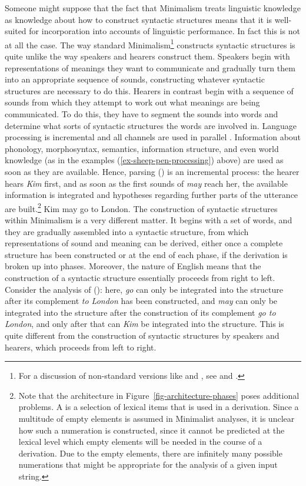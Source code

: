 \documentclass[output=paper
	        ,collection
	        ,collectionchapter
 	        ,biblatex
                ,babelshorthands
                ,newtxmath
                ,draftmode
                ,colorlinks, citecolor=brown
]{langscibook}
\begin{document}
Someone might suppose that the fact that Minimalism treats linguistic knowledge as knowledge about
how to construct syntactic structures means that it is well-suited for incorporation into accounts
of linguistic performance. In fact this is not at all the case. The way standard
Minimalism\footnote{%
For a discussion of non-standard versions like \citet{Phillips2003a} and \citet{Chesi2015a-u}, see
 and .%
} constructs syntactic structures is quite unlike the way speakers and hearers construct them. Speakers begin
with representations of meanings they want to communicate and gradually turn them into an
appropriate sequence of sounds, constructing whatever syntactic structures are necessary to do
this. Hearers in contrast begin with a sequence of sounds from which they attempt to work out what
meanings are being communicated. To do this, they have to segment the sounds into words and
determine what sorts of syntactic structures the words are involved in. 
Language processing is incremental and all channels are used in
parallel \citep{Marslen-Wilson75a,TSKES95a,TSKES96a}. Information about phonology, morphosyntax, semantics, information structure, and even
world knowledge (as in the examples (\ref{ex-sheep-pen-processing}) above) are used as soon as they
are available. Hence, parsing () is an incremental process: the hearer hears \emph{Kim} first,
and as soon as the first sounds of \emph{may} reach her, the available information is integrated
and hypotheses regarding further parts of the utterance are built.\footnote{
  Note that the architecture in Figure~\ref{fig-architecture-phases} poses additional problems. A
  \emph{} is a selection of lexical items that is used in a derivation. Since a multitude
  of empty elements is assumed in Minimalist analyses, it is unclear how such a numeration is
  constructed, since it cannot be predicted at the lexical level which empty elements will be needed in the course of a
  derivation. Due to the empty elements, there are infinitely many possible numerations that might be
  appropriate for the analysis of a given input string.%
}
\ea
Kim may go to London.
\z
The construction of syntactic structures within Minimalism is a very different matter. It begins with a set of words,
and they are gradually assembled into a syntactic structure, from which representations of sound and
meaning can be derived, either once a complete structure has been constructed or at the end of each
phase, if the derivation is broken up into phases. Moreover, the nature of English means that the
construction of a syntactic structure essentially proceeds from right to left. Consider the
analysis of (): here, \emph{go} can only be integrated into the structure after its complement \emph{to London} has been
constructed, and \emph{may} can only be integrated into the structure after the construction of its
complement \emph{go to London}, and only after that can \emph{Kim} be integrated into the
structure. This is quite different from the construction of syntactic structures by speakers and
hearers, which proceeds from left to right.
\end{document}
